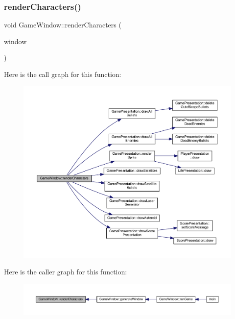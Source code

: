 \subsubsection{\texorpdfstring{render\+Characters()}{renderCharacters()}}
{\footnotesize\ttfamily void Game\+Window\+::render\+Characters (\begin{DoxyParamCaption}\item[{Render\+Window \&}]{window }\end{DoxyParamCaption})}

Here is the call graph for this function\+:\nopagebreak
\begin{figure}[H]
\begin{center}
\leavevmode
\includegraphics[width=350pt]{class_game_window_ac32c7b2e85e30f5bab516551c6277c3a_cgraph}
\end{center}
\end{figure}
Here is the caller graph for this function\+:\nopagebreak
\begin{figure}[H]
\begin{center}
\leavevmode
\includegraphics[width=350pt]{class_game_window_ac32c7b2e85e30f5bab516551c6277c3a_icgraph}
\end{center}
\end{figure}
\mbox{\label{class_game_window_aa4188b605313be96d69cf32d3f143987}} 
